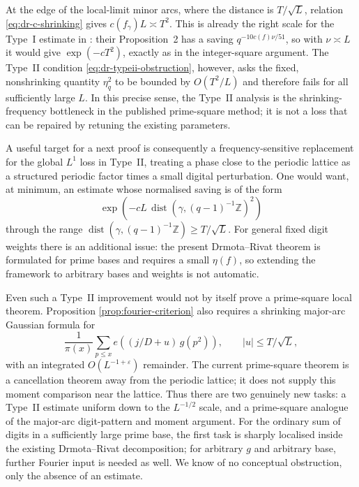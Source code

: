 \documentclass[11pt,reqno]{amsart}
\theoremstyle{plain}
\theoremstyle{definition}
\newcommand{\Z}{\mathbb{Z}}
\newcommand{\eps}{\varepsilon}
\newcommand{\ee}[1]{e\!\left(#1\right)}
\newcommand{\1}{\mathbf 1}
\DeclareMathOperator{\dist}{dist}
\begin{document}
At the edge of the local-limit minor arcs, where the distance is $T/\sqrt L$, relation \eqref{eq:dr-c-shrinking} gives $c(f_\gamma)L\asymp T^2$.  This is already the right scale for the Type~I estimate in \cite{dr-primesquares}: their Proposition~2 has a saving $q^{-10c(f)\nu/51}$, so with $\nu\asymp L$ it would give $\exp(-cT^2)$, exactly as in the integer-square argument.  The Type~II condition \eqref{eq:dr-typeii-obstruction}, however, asks the fixed, nonshrinking quantity $\eta_q^2$ to be bounded by $O(T^2/L)$ and therefore fails for all sufficiently large $L$.  In this precise sense, the Type~II analysis is the shrinking-frequency bottleneck in the published prime-square method; it is not a loss that can be repaired by retuning the existing parameters.

A useful target for a next proof is consequently a frequency-sensitive replacement for the global $L^1$ loss in Type~II, treating a phase close to the periodic lattice as a structured periodic factor times a small digital perturbation.  One would want, at minimum, an estimate whose normalised saving is of the form
\begin{equation}\label{eq:prime-square-target-minor}
 \exp\!\left(-cL\,\dist(\gamma,(q-1)^{-1}\Z)^2\right)
\end{equation}
through the range $\dist(\gamma,(q-1)^{-1}\Z)\ge T/\sqrt L$.  For general fixed digit weights there is an additional issue: the present Drmota--Rivat theorem is formulated for prime bases and requires a small $\eta(f)$, so extending the framework to arbitrary bases and weights is not automatic.

Even such a Type~II improvement would not by itself prove a prime-square local theorem.  Proposition \ref{prop:fourier-criterion} also requires a shrinking major-arc Gaussian formula for
\[
 \frac1{\pi(x)}\sum_{p\le x}
 \ee{(j/D+u)\,g(p^2)},\qquad |u|\le T/\sqrt L,
\]
with an integrated $O(L^{-1+\eps})$ remainder.  The current prime-square theorem is a cancellation theorem away from the periodic lattice; it does not supply this moment comparison near the lattice.  Thus there are two genuinely new tasks: a Type~II estimate uniform down to the $L^{-1/2}$ scale, and a prime-square analogue of the major-arc digit-pattern and moment argument.  For the ordinary sum of digits in a sufficiently large prime base, the first task is sharply localised inside the existing Drmota--Rivat decomposition; for arbitrary $g$ and arbitrary base, further Fourier input is needed as well.  We know of no conceptual obstruction, only the absence of an estimate.
\end{document}
